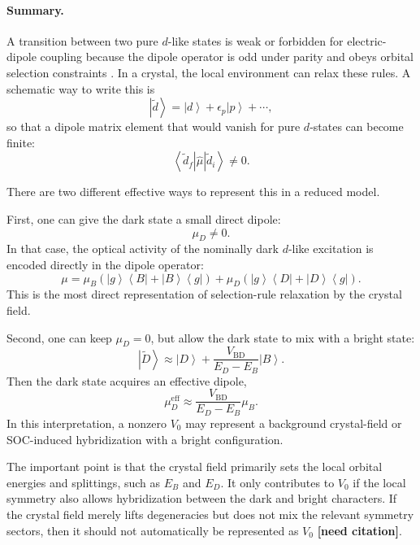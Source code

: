 \documentclass[11pt]{article}
\newcommand{\ket}[1]{\left|#1\right\rangle}
\newcommand{\bra}[1]{\left\langle #1\right|}
\newcommand{\op}[2]{\left|#1\right\rangle\left\langle #2\right|}
\newcommand{\needcite}{\textbf{[need citation]}}
\begin{document}
\paragraph{Summary.}

A transition between two pure \(d\)-like states is weak or forbidden for electric-dipole coupling because the dipole operator is odd under parity and obeys orbital selection constraints \cite{LaporteMeggers1925}. In a crystal, the local environment can relax these rules. A schematic way to write this is
\begin{equation}
\ket{\widetilde d}
=
\ket{d}
+
\epsilon_p\ket{p}
+\cdots,
\end{equation}
so that a dipole matrix element that would vanish for pure \(d\)-states can become finite:
\begin{equation}
\bra{\widetilde d_f}\hat{\mu}\ket{\widetilde d_i}
\neq 0.
\end{equation}

There are two different effective ways to represent this in a reduced model.

First, one can give the dark state a small direct dipole:
\begin{equation}
\mu_D\neq0.
\end{equation}
In that case, the optical activity of the nominally dark \(d\)-like excitation is encoded directly in the dipole operator:
\begin{equation}
\mu
=
\mu_B(\op{g}{B}+\op{B}{g})
+
\mu_D(\op{g}{D}+\op{D}{g}).
\end{equation}
This is the most direct representation of selection-rule relaxation by the crystal field.

Second, one can keep \(\mu_D=0\), but allow the dark state to mix with a bright state:
\begin{equation}
\ket{\widetilde D}
\approx
\ket{D}
+
\frac{V_{\mathrm{BD}}}{E_D-E_B}\ket{B}.
\end{equation}
Then the dark state acquires an effective dipole,
\begin{equation}
\mu_D^{\mathrm{eff}}
\approx
\frac{V_{\mathrm{BD}}}{E_D-E_B}\mu_B.
\end{equation}
In this interpretation, a nonzero \(V_0\) may represent a background crystal-field or SOC-induced hybridization with a bright configuration.

The important point is that the crystal field primarily sets the local orbital energies and splittings, such as \(E_B\) and \(E_D\). It only contributes to \(V_0\) if the local symmetry also allows hybridization between the dark and bright characters. If the crystal field merely lifts degeneracies but does not mix the relevant symmetry sectors, then it should not automatically be represented as \(V_0\) \needcite.
\end{document}
